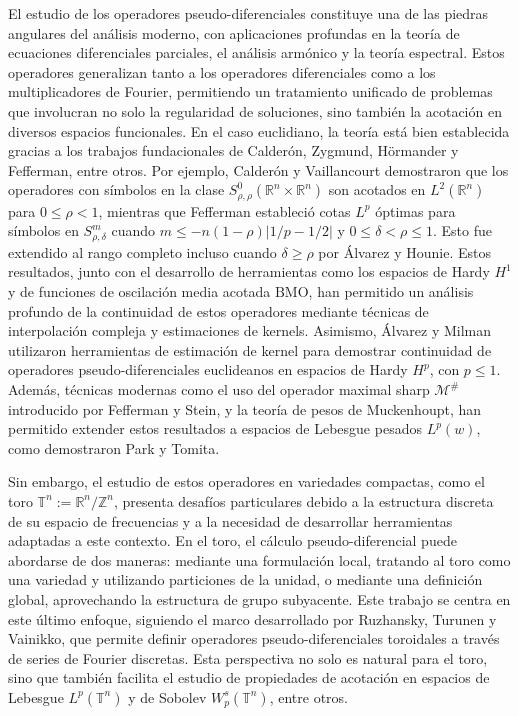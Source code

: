 El estudio de los operadores pseudo-diferenciales constituye una de las piedras angulares del análisis moderno, con aplicaciones profundas en la teoría de ecuaciones diferenciales parciales, el análisis armónico y la teoría espectral. Estos operadores generalizan tanto a los operadores diferenciales como a los multiplicadores de Fourier, permitiendo un tratamiento unificado de problemas que involucran no solo la regularidad de soluciones, sino también la acotación en diversos espacios funcionales. En el caso euclidiano, la teoría está bien establecida gracias a los trabajos fundacionales de Calderón, Zygmund, Hörmander y Fefferman, entre otros. Por ejemplo, Calderón y Vaillancourt demostraron que los operadores con símbolos en la clase $S^0_{\rho,\rho}(\mathbb{R}^n \times \mathbb{R}^n)$ son acotados en $L^2(\mathbb{R}^n)$ para $0 \leq \rho < 1$, mientras que Fefferman estableció cotas $L^p$ óptimas para símbolos en $S^m_{\rho,\delta}$ cuando $m \leq -n(1-\rho)|1/p - 1/2|$ y $0\leq\delta<\rho\leq1$. Esto fue extendido al rango completo incluso cuando $\delta\geq\rho$ por Álvarez y Hounie. Estos resultados, junto con el desarrollo de herramientas como los espacios de Hardy $H^1$ y de funciones de oscilación media acotada $\mathrm{BMO}$, han permitido un análisis profundo de la continuidad de estos operadores mediante técnicas de interpolación compleja y estimaciones de kernels. Asimismo, Álvarez y Milman utilizaron herramientas de estimación de kernel para demostrar continuidad de operadores pseudo-diferenciales euclideanos en espacios de Hardy $H^p$, con $p\leq1$. Además, técnicas modernas como el uso del operador maximal sharp $\mathcal{M}^\#$ introducido por Fefferman y Stein, y la teoría de pesos de Muckenhoupt, han permitido extender estos resultados a espacios de Lebesgue pesados $L^p(w)$, como demostraron Park y Tomita.

Sin embargo, el estudio de estos operadores en variedades compactas, como el toro $\mathbb{T}^n := \mathbb{R}^n / \mathbb{Z}^n$, presenta desafíos particulares debido a la estructura discreta de su espacio de frecuencias y a la necesidad de desarrollar herramientas adaptadas a este contexto. En el toro, el cálculo pseudo-diferencial puede abordarse de dos maneras: mediante una formulación local, tratando al toro como una variedad y utilizando particiones de la unidad, o mediante una definición global, aprovechando la estructura de grupo subyacente. Este trabajo se centra en este último enfoque, siguiendo el marco desarrollado por Ruzhansky, Turunen y Vainikko, que permite definir operadores pseudo-diferenciales toroidales a través de series de Fourier discretas. Esta perspectiva no solo es natural para el toro, sino que también facilita el estudio de propiedades de acotación en espacios de Lebesgue $L^p(\mathbb{T}^n)$ y de Sobolev $W^s_p(\mathbb{T}^n)$, entre otros.

